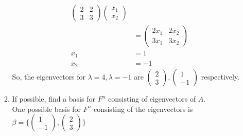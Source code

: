 \documentclass[13pt]{article}
\begin{document}
\begin{enumerate}[label=(\alph*),leftmargin=*]
\begin{enumerate}[label=(\roman*),leftmargin=*]
\begin{align*}
                        \begin{pmatrix}
                          2 & 2 \\
                          3 & 3
                        \end{pmatrix} 
                        \begin{pmatrix}
                          x_1 \\
                          x_2
                        \end{pmatrix} \\
                      &=
                        \begin{pmatrix}
                          2x_1 & 2x_2 \\
                          3x_1 & 3x_2
                        \end{pmatrix} \\
        x_1 &= 1 \\
        x_2 &= -1
      \end{align*}
      So, the eigenvectors for $\lambda = 4, \lambda = -1$ are $
      \begin{pmatrix}
        2 \\
        3
      \end{pmatrix},
      \begin{pmatrix}
        1 \\
        -1
      \end{pmatrix}$ respectively.
    \item If possible, find a basis for $F^n$ consisting of eigenvectors of $A$. \\
      One possible basis for $F^n$ consisting of the eigenvectors is $\beta = \bigg\{
      \begin{pmatrix}
        1 \\
        -1
      \end{pmatrix},
      \begin{pmatrix}
        2 \\
        3
      \end{pmatrix}
      \bigg\}$
      

\end{enumerate}
\end{enumerate}
\end{document}
